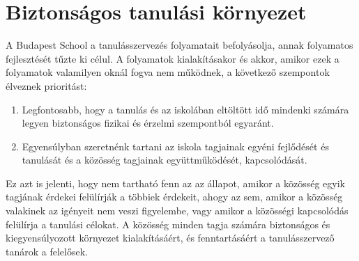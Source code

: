 \section{Biztonságos tanulási környezet}

A Budapest School a tanulásszervezés folyamatait befolyásolja, annak folyamatos
fejlesztését tűzte ki célul. A folyamatok kialakításakor és akkor, amikor ezek
a folyamatok valamilyen oknál fogva nem működnek, a következő szempontok
élveznek prioritást:

\begin{enumerate}

  \item Legfontosabb, hogy a tanulás és az iskolában eltöltött idő mindenki
        számára legyen biztonságos fizikai és érzelmi szempontból egyaránt.

  \item Egyensúlyban szeretnénk tartani az iskola  tagjainak egyéni fejlődését és
        tanulását és a közösség tagjainak együttműködését, kapcsolódását.

\end{enumerate}
Ez azt is jelenti, hogy nem tartható fenn az az állapot, amikor a közösség
egyik tagjának érdekei felülírják a többiek érdekeit, ahogy az sem, amikor a
közösség valakinek az igényeit nem veszi figyelembe, vagy amikor a közösségi
kapcsolódás felülírja a tanulási célokat. A közösség minden tagja számára
biztonságos és kiegyensúlyozott környezet kialakításáért, és fenntartásáért a
tanulásszervező tanárok a felelősek.